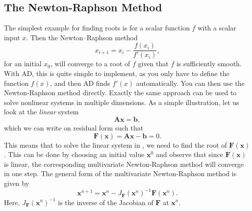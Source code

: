 \subsection{The Newton-Raphson Method}
The simplest example for finding roots is for a scalar function $f$ with a scalar input $x$. Then the Newton--Raphson method
\begin{equation*}
    x_{i+1} = x_i - \frac{f(x_i)}{f'(x_i)},
\end{equation*}
for an initial $x_0$, will converge to a root of $f$ given that $f$ is sufficiently smooth. With AD, this is quite simple to implement, as you only have to define the function $f(x)$, and then AD finds $f'(x)$ automatically. You can then use the Newton-Raphson method directly. Exactly the same approach can be used to solve nonlinear systems in multiple dimensions. As a simple illustration, let us look at the \emph{linear} system 
\begin{equation}
    \textbf{A}\boldsymbol{x} = \textbf{b},
    \label{eq:linearSystem}
\end{equation}
which we can write on residual form such that
\begin{equation*}
	\boldsymbol{F}(\boldsymbol{x}) = \textbf{A}\boldsymbol{x} - \boldsymbol{b} = 0 .
\end{equation*}
This means that to solve the linear system in , we need to find the root of $\boldsymbol{F}(\boldsymbol{x})$. This can be done by choosing an initial value $\boldsymbol{x}^0$ and observe that since $\boldsymbol{F}(\boldsymbol{x})$ is linear, the corresponding multivariate Newton-Raphson method will converge in one step. The general form of the multivariate Newton-Raphson method is given by
\begin{equation}
	\boldsymbol{x}^{n+1} = \boldsymbol{x}^n - J_{\boldsymbol{F}}  (\boldsymbol{x}^n)^{-1} \boldsymbol{F}(\boldsymbol{x}^n).
    \label{eq:newtonRaphsonVector}
\end{equation}
Here, $J_{\boldsymbol{F}}  (\boldsymbol{x}^n)^{-1}$ is the inverse of the Jacobian of $\boldsymbol{F}$ at $\boldsymbol{x}^n$. 


